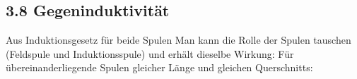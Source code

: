 \subsection*{3.8 Gegeninduktivität}
    Aus Induktionsgesetz für beide Spulen
    Man kann die Rolle der Spulen tauschen (Feldspule und Induktionsspule) und erhält dieselbe Wirkung:
    Für übereinanderliegende Spulen gleicher Länge und gleichen Querschnitts:
